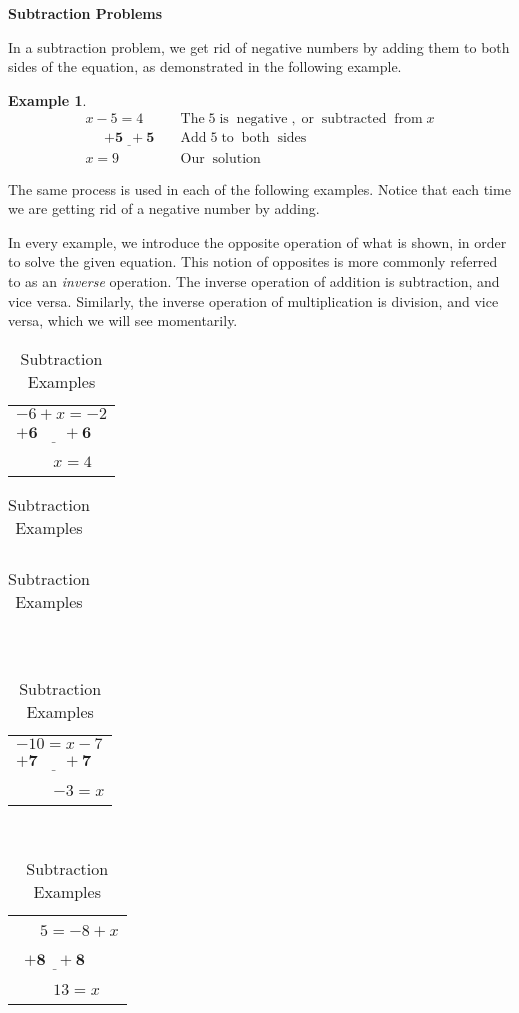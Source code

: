 \documentclass[12pt]{book}
\theoremstyle{definition}
\newtheorem{example}{Example}
\newcommand{\tmmathbf}[1]{\ensuremath{\boldsymbol{#1}}}
\newcommand{\tmop}[1]{\ensuremath{\operatorname{#1}}}
\begin{document}
\par
{\bf Subtraction Problems}\par
In a subtraction problem, we get rid of negative numbers by adding them to both sides of the equation, as demonstrated in the following example.
\begin{example}\label{Lin6}
  \begin{eqnarray*}
    x - 5 = 4~~~ &  & \tmop{The} 5 \tmop{is} \tmop{negative}, \tmop{or}
    \tmop{subtracted} \tmop{from} x\\
    ~~~~~~\tmmathbf{\underline{+ 5 ~~+ 5}} &  & \tmop{Add} 5 \tmop{to} \tmop{both}
    \tmop{sides}\\
    x = 9\qquad  &  & \tmop{Our} \tmop{solution}
  \end{eqnarray*}
\end{example}
The same process is used in each of the following examples. Notice that each time we are getting rid of a negative
number by adding.\par
In every example, we introduce the opposite operation of what is shown, in order to solve the given equation.  This notion of opposites is more commonly referred to as an \textit{inverse} operation.  The inverse operation of addition is subtraction, and vice versa.  Similarly, the inverse operation of multiplication is division, and vice versa, which we will see momentarily.
  \begin{table}[h]
    \begin{tabular}{l}
      $- 6 + x = - 2$\\
      $\tmmathbf{\underline{+ 6 ~~~~~~~+ 6}}$\\
      ~~~~ $x = 4$
    \end{tabular} \begin{tabular}{l}
      
    \end{tabular}\begin{tabular}{l}
      
    \end{tabular} \ \ \ \ \ \ \ \ \ \ \ \ \ \ \ \ \ \ \begin{tabular}{l}
      $- 10 = x - 7$\\
      $ \tmmathbf{\underline{+ 7 ~~~~~~~+ 7}}$\\
      ~~~~ $- 3 = x$
    \end{tabular} \ \ \ \ \ \ \ \ \ \ \ \ \ \ \ \ \ \ \ \begin{tabular}{l}
      ~~~$5 = - 8 + x$\\
      ~$\tmmathbf{\underline{+ 8 ~~~+ 8}}$\\
      ~~~~ $13 = x$
    \end{tabular}
    \caption{Subtraction Examples}
  \end{table}
\end{document}
